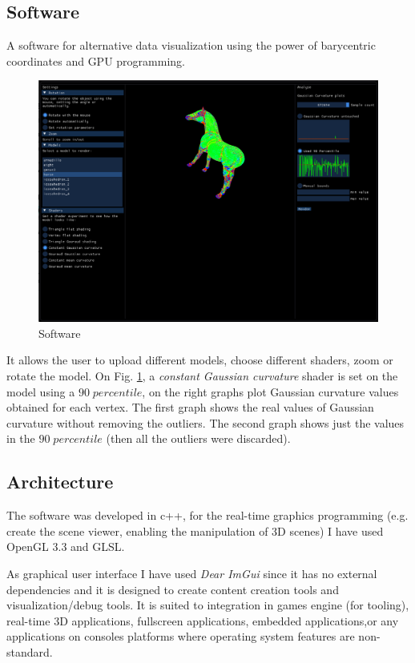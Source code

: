 \subsection{Software}
A software for alternative data visualization using the power of barycentric coordinates and GPU programming.
\begin{figure}[!h]
    \includegraphics[scale=0.4]{images/program.png}
    \caption{Software}
    \label{fig:software}
\end{figure}
It allows the user to upload different models, choose different shaders, zoom or rotate the model.
On Fig. \ref{fig:software}, a \textit{constant Gaussian curvature} shader is set on the model using a $90 \; percentile$, on the right graphs plot Gaussian curvature values obtained for each vertex. The first graph shows the real values of Gaussian curvature without removing the outliers. The second graph shows just the values in the $90 \; percentile$ (then all the outliers were discarded).

\subsection{Architecture}
The software was developed in c++, for the real-time graphics programming (e.g. create the scene viewer, enabling the manipulation of 3D scenes) I have used OpenGL $3.3$ and GLSL.

As graphical user interface I have used \textit{Dear ImGui} since it has no external dependencies and it is designed to create content creation tools and visualization/debug tools. It is suited to integration in games engine (for tooling), real-time 3D applications, fullscreen applications, embedded applications,or any applications on consoles platforms where operating system features are non-standard.

